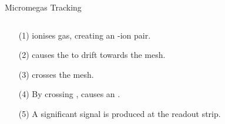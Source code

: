 \begin{frame}{Micromegas Tracking}
    \label{20.07::micromegas_tracking}

    \vspace{18pt}

    \begin{columns}[onlytextwidth,T]
        \begin{column}{.34\linewidth}
            \begin{enumerate}
                \item[(1)]
                     ionises gas, creating an -ion pair.

                \vspace{2pt}
                \item[(2)]
                     causes the  to drift towards the mesh.

                \vspace{2pt}
                \item[(3)]
                     crosses the mesh.

                \vspace{2pt}
                \item[(4)]
                    By crossing ,  causes an .

                \vspace{2pt}
                \item[(5)]
                    A significant signal is produced at the readout strip.
            \end{enumerate}
        \end{column}

        \begin{column}{.64\linewidth}
            \vspace{0pt}
            \begin{center}
            \end{center}
        \end{column}
    \end{columns}

\end{frame}
